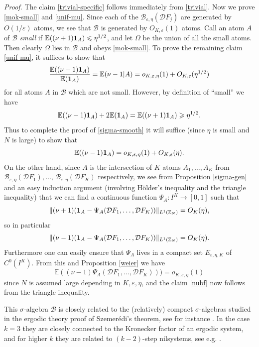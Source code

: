 \documentclass[12pt,a4paper,reqno]{amsart}
\numberwithin{equation}{section}
\theoremstyle{plain}
\theoremstyle{definition}
\renewcommand{\leq}{\leqslant}
\renewcommand{\geq}{\geqslant}
\def\B{{\mathcal B}}
\def\D{{\mathcal D}}
\def\Z{{\mathbb Z}}
\def\E{{\mathbb E}}
\def\eps{{\varepsilon}}
\def\vs{\vspace{11pt}}
\def\ni{\noindent}
\def\proof{\noindent\textit{Proof. }}
\def\endproof{\hfill{\usebox{\proofbox}}}
\def\emph#1{{\it #1}}
\begin{document}
\proof
The claim \eqref{trivial-specific} follows immediately from \eqref{trivial}.  Now we prove \eqref{mok-small} and \eqref{unif-mu}.
Since each of the $\B_{\eps,\eta}(\D F_j)$ are generated by $O(1/\eps)$ atoms, we see that $\B$ is generated by $O_{K,\eps}(1)$ atoms.
Call an atom $A$ of $\B$ \emph{small} if $\E( (\nu + 1) {\bf 1}_A) \leq \eta^{1/2}$, and let $\Omega$ be the union of all the small atoms.  Then clearly $\Omega$ lies in $\B$ and obeys \eqref{mok-small}.  To prove the remaining claim \eqref{unif-mu}, it suffices to show that
\begin{equation}\label{sigma-smooth}
\frac{ \E( (\nu - 1) {\bf 1}_A ) }{ \E( {\bf 1}_A ) } = \E( \nu - 1 | A ) = o_{K,\eps,\eta}(1) + O_{K,\eps}(\eta^{1/2})
\end{equation}
for all atoms $A$ in $\B$ which are not small.  However, by definition of ``small'' we have
$$ \E( (\nu - 1) {\bf 1}_A ) + 2 \E( {\bf 1}_A ) = \E( (\nu+1) {\bf 1}_A ) \geq \eta^{1/2}.$$
Thus to complete the proof of \eqref{sigma-smooth} it will suffice (since $\eta$ is small and $N$ is large) to show that
\begin{equation}\label{nubf}
\E( (\nu - 1) {\bf 1}_A ) = o_{K,\eps,\eta}(1) + O_{K,\eps}(\eta).
\end{equation}
On the other hand, since $A$ is the intersection of $K$ atoms $A_1, \ldots, A_K$ from $\B_{\eps,\eta}(\D F_1), \ldots$, $\B_{\eps,\eta}(\D F_K)$
respectively, we see from Proposition \ref{sigma-gen} and an easy induction argument (involving H\"older's inequality and the triangle inequality) that we can find a continuous 
function $\Psi_A: I^K \to [0,1]$ such that
$$\| (\nu + 1) ({\bf 1}_A - \Psi_A(\D F_1, \ldots, \D F_K)) \|_{L^1(\Z_N)} = O_K(\eta),$$
so in particular
$$ \| (\nu - 1) ({\bf 1}_A - \Psi_A(\D F_1, \ldots, \D F_K)) \|_{L^1(\Z_N)} = O_K(\eta).$$
Furthermore one can easily ensure that $\Psi_A$ lives in a compact set $E_{\eps,\eta,K}$ of $C^0(I^K)$.  From this and Proposition \ref{weier} we have
$$ \E( (\nu - 1) \Psi_A(\D F_1, \ldots, \D F_K)) ) = o_{K,\eps,\eta}(1)$$
since $N$ is assumed large depending in $K,\eps,\eta$, and the claim \eqref{nubf} now follows from the triangle inequality.
\endproof\vs

\ni \emph{Remarks.} This $\sigma$-algebra $\B$ is closely related to the (relatively) compact $\sigma$-algebras studied in the ergodic theory proof of Szemer\'edi's theorem, see for instance \cite{furst,FKO}.  In the case $k=3$ they are closely connected to the Kronecker factor of an ergodic system, and for higher $k$ they are related to $(k-2)$-step nilsystems, see e.g. \cite{host-kra2,ziegler}.
\end{document}
